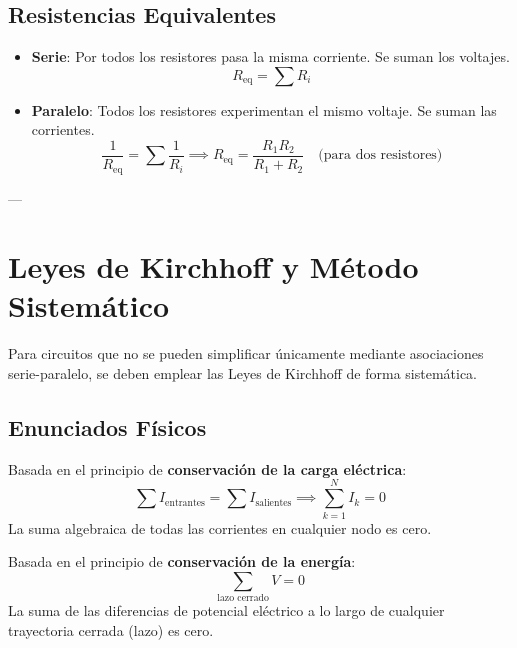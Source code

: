 \documentclass[12pt, a4paper]{article}
\begin{document}
\subsection{Resistencias Equivalentes}
\begin{itemize}
    \item \textbf{Serie}: Por todos los resistores pasa la misma corriente. Se suman los voltajes.
    \begin{equation}
        R_{\text{eq}} = \sum R_i
    \end{equation}
    \item \textbf{Paralelo}: Todos los resistores experimentan el mismo voltaje. Se suman las corrientes.
    \begin{equation}
        \frac{1}{R_{\text{eq}}} = \sum \frac{1}{R_i} \implies R_{\text{eq}} = \frac{R_1 R_2}{R_1 + R_2} \quad \text{(para dos resistores)}
    \end{equation}
\end{itemize}

---

\section{Leyes de Kirchhoff y Método Sistemático}

Para circuitos que no se pueden simplificar únicamente mediante asociaciones serie-paralelo, se deben emplear las Leyes de Kirchhoff de forma sistemática.

\subsection{Enunciados Físicos}

\begin{definicion}
Basada en el principio de \textbf{conservación de la carga eléctrica}:
\begin{equation}
    \sum I_{\text{entrantes}} = \sum I_{\text{salientes}} \implies \sum_{k=1}^N I_k = 0
\end{equation}
La suma algebraica de todas las corrientes en cualquier nodo es cero.
\end{definicion}

\begin{definicion}
Basada en el principio de \textbf{conservación de la energía}:
\begin{equation}
    \sum_{\text{lazo cerrado}} V = 0
\end{equation}
La suma de las diferencias de potencial eléctrico a lo largo de cualquier trayectoria cerrada (lazo) es cero.
\end{definicion}
\end{document}
